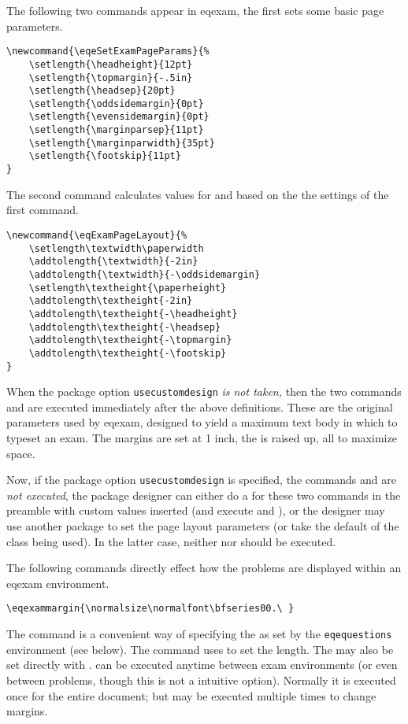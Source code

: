 \documentclass{article}
\edef\amtIndent{\the\parindent}
\begin{document}
The following two commands appear in \textsf{eqexam}, the first sets some basic
page parameters.
\begin{Verbatim}[xleftmargin=\amtIndent,fontsize=\fontsize{9}{11}\selectfont]
\newcommand{\eqeSetExamPageParams}{%
    \setlength{\headheight}{12pt}
    \setlength{\topmargin}{-.5in}
    \setlength{\headsep}{20pt}
    \setlength{\oddsidemargin}{0pt}
    \setlength{\evensidemargin}{0pt}
    \setlength{\marginparsep}{11pt}
    \setlength{\marginparwidth}{35pt}
    \setlength{\footskip}{11pt}
}
\end{Verbatim}
The second command calculates values for  and 
based on the the settings of the first command.
\begin{Verbatim}[xleftmargin=\amtIndent,fontsize=\fontsize{9}{11}\selectfont]
\newcommand{\eqExamPageLayout}{%
    \setlength\textwidth\paperwidth
    \addtolength{\textwidth}{-2in}
    \addtolength{\textwidth}{-\oddsidemargin}
    \setlength\textheight{\paperheight}
    \addtolength\textheight{-2in}
    \addtolength\textheight{-\headheight}
    \addtolength\textheight{-\headsep}
    \addtolength\textheight{-\topmargin}
    \addtolength\textheight{-\footskip}
}
\end{Verbatim}
When the package option \texttt{usecustomdesign} \textit{is not taken,}
then the two commands  and 
are executed immediately after the above definitions. These are the
original parameters used by \textsf{eqexam}, designed to yield a maximum
text body in which to typeset an exam. The margins are set at 1 inch, the
 is raised up, all to maximize space.

Now, if the package option \texttt{usecustomdesign} is specified, the
commands  and  are \emph{not
executed}, the package designer can either do a  for
these two commands in the preamble with custom values inserted (and
execute  and ), or the
designer may use another package to set the page layout parameters (or
take the default of the class being used). In the latter case,
neither  nor  should be executed.

\newtopic The following commands directly effect how the problems are
displayed within an \textsf{eqexam} environment.

\begin{Verbatim}[xleftmargin=\amtIndent,fontsize=\fontsize{9}{11}\selectfont]
\eqexammargin{\normalsize\normalfont\bfseries00.\ }
\end{Verbatim}
The command  is a convenient way of specifying the
 as set by the \texttt{eqequestions} environment (see
below). The command uses  to set the  length.
The  may also be set directly with .
 can be executed anytime between exam environments (or
even between problems, though this is not a intuitive option). Normally it
is executed once for the entire document; but may be executed multiple
times to change margins.
\end{document}
